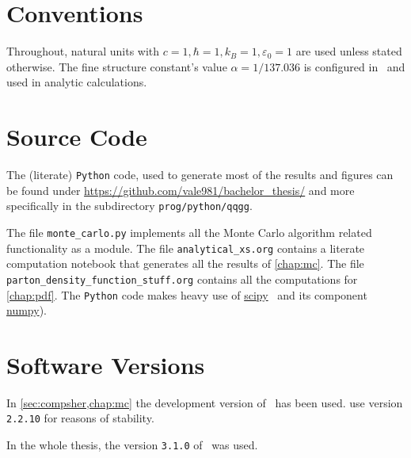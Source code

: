 \section{Conventions}%
\label{sec:convent}

Throughout, natural units with
\(c=1, \hbar = 1, k_B=1, \varepsilon_0 = 1\) are used unless stated
otherwise. The fine structure constant's value \(\alpha = 1/137.036\)
is configured in \sherpa\ and used in analytic calculations.

\section{Source Code}%
\label{sec:source}

The (literate) \texttt{Python} code, used to generate most of the
results and figures can be found under
\url{https://github.com/vale981/bachelor_thesis/} and more
specifically in the subdirectory \texttt{prog/python/qqgg}.

The file \texttt{monte\_carlo.py} implements all the Monte Carlo
algorithm related functionality as a module. The file
\texttt{analytical\_xs.org} contains a literate computation notebook
that generates all the results of \cref{chap:mc}. The file
\texttt{parton\_density\_function\_stuff.org} contains all the
computations for \cref{chap:pdf}. The \texttt{Python} code makes heavy
use of \href{https://www.scipy.org/}{scipy}~\cite{2020Virtanen:Sc} and
its component \href{https://numpy.org/}{numpy}).

\section{Software Versions}%
\label{sec:versions}

In \cref{sec:compsher,chap:mc} the development version of \sherpa\ has
been used.  use version \texttt{2.2.10} for
reasons of stability.

In the whole thesis, the version \texttt{3.1.0} of \rivet\ was used.

